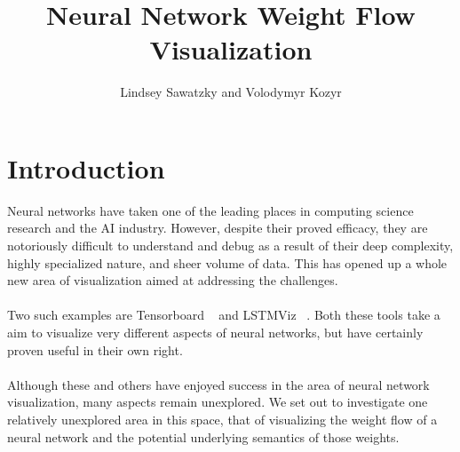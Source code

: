 \documentclass[journal]{vgtc}                %
\title{Neural Network Weight Flow Visualization}
\author{Lindsey Sawatzky and Volodymyr Kozyr}
\begin{document}
\maketitle
\section{Introduction}
Neural networks have taken one of the leading places in computing science research and the AI industry.
However, despite their proved efficacy, they are notoriously difficult to understand and debug as a result of their deep complexity, highly specialized nature, and sheer volume of data.
This has opened up a whole new area of visualization aimed at addressing the challenges.
\\
\\
Two such examples are Tensorboard ~\cite{tensorboard} and LSTMViz ~\cite{lstmviz}.
Both these tools take a aim to visualize very different aspects of neural networks, but have certainly proven useful in their own right.
\\
\\
Although these and others have enjoyed success in the area of neural network visualization, many aspects remain unexplored.
We set out to investigate one relatively unexplored area in this space, that of visualizing the weight flow of a neural network and the potential underlying semantics of those weights.




\end{document}
